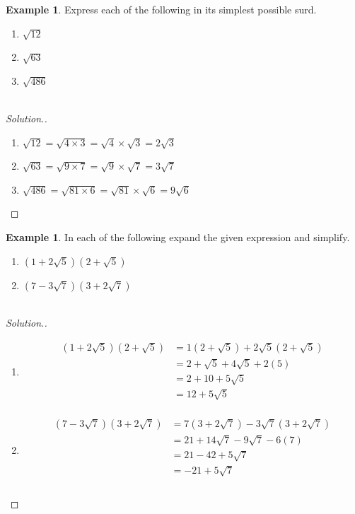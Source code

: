 \documentclass[11pt,a4paper]{article}
\theoremstyle{definition}
\newtheorem{example}[thm]{Example}
\newenvironment{solution}
  {\renewcommand{\qedsymbol}{}\begin{proof}[\textit{Solution}.]}
  {\end{proof}}
\begin{document}
\begin{example}

Express each of the following in its simplest possible surd.
\begin{enumerate}
\item $\sqrt{12}$\\
\item $\sqrt{63}$\\
\item $\sqrt{486}$\\\\
\end{enumerate}
\end{example}
\begin{solution}

\begin{enumerate}
\item $\sqrt{12}=\sqrt{4\times 3}=\sqrt{4}\times \sqrt{3}=2\sqrt{3}$\\
\item $\sqrt{63}=\sqrt{9\times 7}=\sqrt{9}\times \sqrt{7}=3\sqrt{7}$\\
\item $\sqrt{486}=\sqrt{81 \times 6}=\sqrt{81}\times \sqrt{6}=9\sqrt{6}$\\
\end{enumerate}
\end{solution}
\begin{example}

In each of the following expand the given expression and simplify.
\begin{enumerate}
\item $(1+2\sqrt{5})(2+\sqrt{5})$\\
\item $(7-3\sqrt{7})(3+2\sqrt{7})$\\\\
\end{enumerate}
\end{example}
\begin{solution}

\begin{enumerate}
\item
\begin{align*}
(1+2\sqrt{5})(2+\sqrt{5}) &= 1(2+\sqrt{5})+2\sqrt{5}(2+\sqrt{5})\\
& = 2 + \sqrt{5}+4\sqrt{5}+2(5)\\
& = 2 + 10 +5\sqrt{5}\\
& = 12+5\sqrt{5}\\
\end{align*}

\item
\begin{align*}
(7-3\sqrt{7})(3+2\sqrt{7}) & = 7(3+2\sqrt{7})-3\sqrt{7}(3+2\sqrt{7})\\
& = 21 + 14\sqrt{7}-9\sqrt{7}-6(7)\\
& = 21-42+5\sqrt{7}\\
& = -21+5\sqrt{7}\\\\
\end{align*}
\end{enumerate}


\end{solution}
\end{document}
